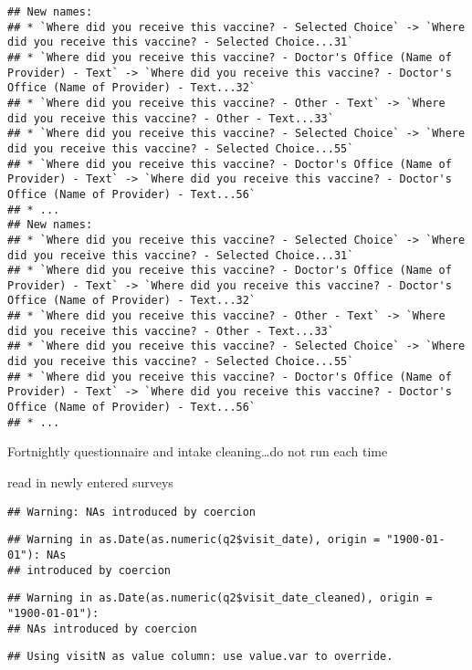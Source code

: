 \documentclass[
]{article}
\begin{document}
\begin{verbatim}
## New names:
## * `Where did you receive this vaccine? - Selected Choice` -> `Where did you receive this vaccine? - Selected Choice...31`
## * `Where did you receive this vaccine? - Doctor's Office (Name of Provider) - Text` -> `Where did you receive this vaccine? - Doctor's Office (Name of Provider) - Text...32`
## * `Where did you receive this vaccine? - Other - Text` -> `Where did you receive this vaccine? - Other - Text...33`
## * `Where did you receive this vaccine? - Selected Choice` -> `Where did you receive this vaccine? - Selected Choice...55`
## * `Where did you receive this vaccine? - Doctor's Office (Name of Provider) - Text` -> `Where did you receive this vaccine? - Doctor's Office (Name of Provider) - Text...56`
## * ...
## New names:
## * `Where did you receive this vaccine? - Selected Choice` -> `Where did you receive this vaccine? - Selected Choice...31`
## * `Where did you receive this vaccine? - Doctor's Office (Name of Provider) - Text` -> `Where did you receive this vaccine? - Doctor's Office (Name of Provider) - Text...32`
## * `Where did you receive this vaccine? - Other - Text` -> `Where did you receive this vaccine? - Other - Text...33`
## * `Where did you receive this vaccine? - Selected Choice` -> `Where did you receive this vaccine? - Selected Choice...55`
## * `Where did you receive this vaccine? - Doctor's Office (Name of Provider) - Text` -> `Where did you receive this vaccine? - Doctor's Office (Name of Provider) - Text...56`
## * ...
\end{verbatim}

Fortnightly questionnaire and intake cleaning\ldots do not run each time

read in newly entered surveys

\begin{verbatim}
## Warning: NAs introduced by coercion
\end{verbatim}

\begin{verbatim}
## Warning in as.Date(as.numeric(q2$visit_date), origin = "1900-01-01"): NAs
## introduced by coercion
\end{verbatim}

\begin{verbatim}
## Warning in as.Date(as.numeric(q2$visit_date_cleaned), origin = "1900-01-01"):
## NAs introduced by coercion
\end{verbatim}

\begin{verbatim}
## Using visitN as value column: use value.var to override.
\end{verbatim}
\end{document}
